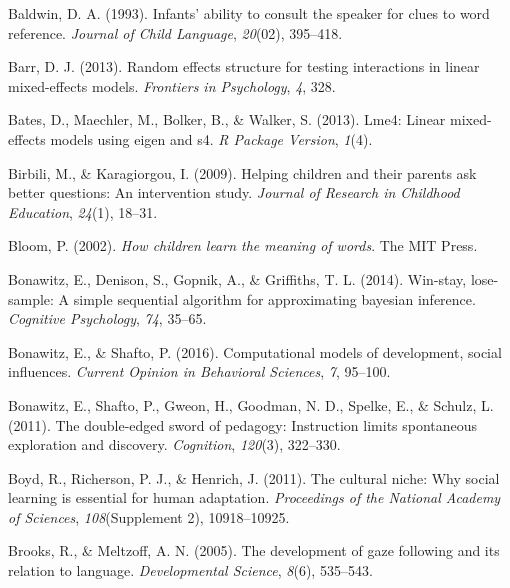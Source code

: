 \documentclass[oneside]{report}
\begin{document}
\leavevmode\hypertarget{ref-baldwin1993infants}{}%
Baldwin, D. A. (1993). Infants' ability to consult the speaker for clues
to word reference. \emph{Journal of Child Language}, \emph{20}(02),
395--418.

\leavevmode\hypertarget{ref-barr2013random}{}%
Barr, D. J. (2013). Random effects structure for testing interactions in
linear mixed-effects models. \emph{Frontiers in Psychology}, \emph{4},
328.

\leavevmode\hypertarget{ref-bates2013lme4}{}%
Bates, D., Maechler, M., Bolker, B., \& Walker, S. (2013). Lme4: Linear
mixed-effects models using eigen and s4. \emph{R Package Version},
\emph{1}(4).

\leavevmode\hypertarget{ref-birbili2009helping}{}%
Birbili, M., \& Karagiorgou, I. (2009). Helping children and their
parents ask better questions: An intervention study. \emph{Journal of
Research in Childhood Education}, \emph{24}(1), 18--31.

\leavevmode\hypertarget{ref-bloom2002children}{}%
Bloom, P. (2002). \emph{How children learn the meaning of words}. The
MIT Press.

\leavevmode\hypertarget{ref-bonawitz2014win}{}%
Bonawitz, E., Denison, S., Gopnik, A., \& Griffiths, T. L. (2014).
Win-stay, lose-sample: A simple sequential algorithm for approximating
bayesian inference. \emph{Cognitive Psychology}, \emph{74}, 35--65.

\leavevmode\hypertarget{ref-bonawitz2016computational}{}%
Bonawitz, E., \& Shafto, P. (2016). Computational models of development,
social influences. \emph{Current Opinion in Behavioral Sciences},
\emph{7}, 95--100.

\leavevmode\hypertarget{ref-bonawitz2011double}{}%
Bonawitz, E., Shafto, P., Gweon, H., Goodman, N. D., Spelke, E., \&
Schulz, L. (2011). The double-edged sword of pedagogy: Instruction
limits spontaneous exploration and discovery. \emph{Cognition},
\emph{120}(3), 322--330.

\leavevmode\hypertarget{ref-boyd2011cultural}{}%
Boyd, R., Richerson, P. J., \& Henrich, J. (2011). The cultural niche:
Why social learning is essential for human adaptation. \emph{Proceedings
of the National Academy of Sciences}, \emph{108}(Supplement 2),
10918--10925.

\leavevmode\hypertarget{ref-brooks2005development}{}%
Brooks, R., \& Meltzoff, A. N. (2005). The development of gaze following
and its relation to language. \emph{Developmental Science}, \emph{8}(6),
535--543.
\end{document}
